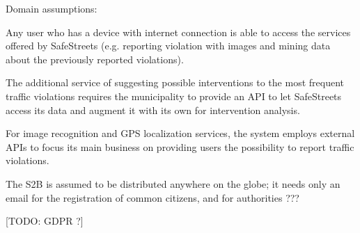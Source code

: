 Domain assumptions:
\begin{enumerate}[label={D\arabic*.}]
	 \label{D_email}
     \label{D_reports}
     \label{D_occurrency}
     \label{D_mun_availability}
   	 \label{D_mun_accuracy}
     \label{D_supervisor}
     \label{D_gps}
     \label{D_internet}
\end{enumerate}

Any user who has a device with internet connection is able to access the services offered by SafeStreets (e.g. reporting violation with images and mining data about the previously reported violations).

The additional service of suggesting possible interventions to the most frequent traffic violations requires the municipality to provide an API to let SafeStreets access its data and augment it with its own for intervention analysis.

For image recognition and GPS localization services, the system employs external APIs to focus its main business on providing users the possibility to report traffic violations.

The S2B is assumed to be distributed anywhere on the globe; it needs only an email for the registration of common citizens, and for authorities ???

[TODO: GDPR ?]